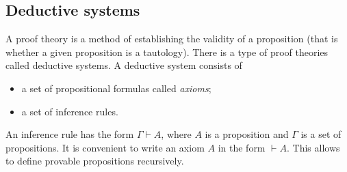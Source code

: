 

\setcounter{section}{2}
\setcounter{subsection}{1}
\setcounter{dfn}{0}

\subsection{Deductive systems}
A proof theory is a method of establishing the validity of a proposition (that is whether a given proposition is a tautology).
There is a type of proof theories called deductive systems.
A deductive system consists of
\begin{itemize}
\item a set of propositional formulas called \emph{axioms};
\item a set of inference rules.
\end{itemize}

An inference rule has the form $\Gamma \vdash A$, where $A$ is a proposition and $\Gamma$ is a set of propositions.
It is convenient to write an axiom $A$ in the form $\vdash A$.
This allows to define provable propositions recursively.


